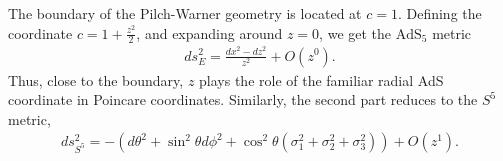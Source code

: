 \documentclass[11pt]{article}
\newcommand{\AdS}{\mathrm{AdS}}
\begin{document}
\begin{itemize}


The boundary of the Pilch-Warner geometry is located at $c = 1$.
Defining the coordinate $c = 1 + \frac{z^2}{2}$, and expanding around $z = 0$, we get the $\AdS_5$ metric
\begin{align}
ds_E^2 =
\frac{dx^2 - dz^2}{z^2} + O(z^{0}).
\end{align}
Thus, close to the boundary, $z$ plays the role of the familiar radial AdS coordinate in Poincare coordinates.
Similarly, the second part reduces to the $S^5$ metric,
\begin{align}
ds_{S^5}^2 =
-\left(d\theta^2 + \sin^2\theta d\phi^2 + \cos^2\theta\left(\sigma_1^2 + \sigma_2^2 + \sigma_3^2\right)\right) + O(z^{1}).
\end{align}


\end{itemize}
\end{document}
